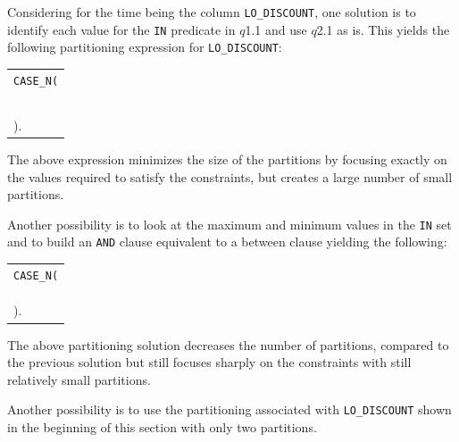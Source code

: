 \documentclass[runningheads]{comsis2}
\begin{document}
Considering for the time being the column {\tt LO\_DISCOUNT}, 
one solution is to identify each value 
for the {\tt IN} predicate in $q$1.1 
and use $q$2.1 as is. This yields the following partitioning expression 
for {\tt LO\_DISCOUNT}:
\begin{center}
\begin{tabular}{l}
{\tt CASE\_N(} \\
\hspace{0.1in}{\tt LO\_DISCOUNT = 1,} \\
\hspace{0.1in}{\tt LO\_DISCOUNT = 4,} \\
\hspace{0.1in}{\tt LO\_DISCOUNT = 5,} \\
\hspace{0.1in}{\tt LO\_DISCOUNT >= 7,} \\
\hspace{0.1in}{\tt NO CASE OR UNKNOWN} \\
{)}. \\
\end{tabular}
\end{center}
The above expression minimizes the size of the partitions 
by focusing exactly on the values required to satisfy the constraints, 
but creates a large number of small partitions. 

Another possibility is to look at the maximum and minimum 
values in the {\tt IN} set and to build an {\tt AND} clause equivalent to 
a between clause yielding the following:
\begin{center}
\begin{tabular}{l}
{\tt CASE\_N(} \\
\hspace{0.1in}{\tt LO\_DISCOUNT >= 1 AND LO\_DISCOUNT <= 5,} \\
\hspace{0.1in}{\tt LO\_DISCOUNT >= 7,} \\
\hspace{0.1in}{\tt NO CASE OR UNKNOWN} \\
{)}. \\
\end{tabular}
\end{center}

\noindent The above partitioning solution decreases the number of partitions, 
compared to the previous solution but still focuses sharply on the constraints 
with still relatively small partitions. 

Another possibility is to use the partitioning associated with {\tt LO\_DISCOUNT} shown 
in the beginning of this section with only two partitions. 
\end{document}
